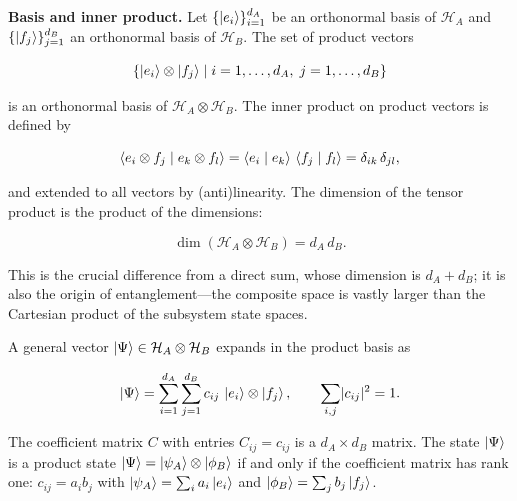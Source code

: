 \medskip\noindent\textbf{Basis and inner product.}
Let $\{\ket{e_i}\}_{i=1}^{d_A}$ be an orthonormal basis of $\mathcal{H}_A$ and $\{\ket{f_j}\}_{j=1}^{d_B}$ an orthonormal basis of $\mathcal{H}_B$. The set of product vectors
\begin{linenomath}
\begin{equation}
\{\ket{e_i} \otimes \ket{f_j} \mid i = 1,\ldots,d_A,\; j = 1,\ldots,d_B\}
\label{eq:tensor-product-basis}
\end{equation}
\end{linenomath}
is an orthonormal basis of $\mathcal{H}_A \otimes \mathcal{H}_B$. The inner product on product vectors is defined by
\begin{linenomath}
\begin{equation}
\braket{e_i \otimes f_j \mid e_k \otimes f_l}
= \braket{e_i \mid e_k}\,\braket{f_j \mid f_l}
= \delta_{ik}\,\delta_{jl},
\label{eq:tensor-inner-product}
\end{equation}
\end{linenomath}
and extended to all vectors by (anti)linearity. The dimension of the tensor product is the product of the dimensions:
\begin{linenomath}
\begin{equation}
\dim(\mathcal{H}_A \otimes \mathcal{H}_B) = d_A\,d_B.
\end{equation}
\end{linenomath}
This is the crucial difference from a direct sum, whose dimension is $d_A + d_B$; it is also the origin of entanglement---the composite space is vastly larger than the Cartesian product of the subsystem state spaces.

A general vector $\ket{\Psi} \in \mathcal{H}_A \otimes \mathcal{H}_B$ expands in the product basis as
\begin{linenomath}
\begin{equation}
\ket{\Psi} = \sum_{i=1}^{d_A}\sum_{j=1}^{d_B} c_{ij}\,\ket{e_i} \otimes \ket{f_j},
\qquad
\sum_{i,j} \lvert c_{ij}\rvert^2 = 1.
\end{equation}
\end{linenomath}
The coefficient matrix $C$ with entries $C_{ij} = c_{ij}$ is a $d_A \times d_B$ matrix. The state $\ket{\Psi}$ is a product state $\ket{\Psi} = \ket{\psi_A} \otimes \ket{\phi_B}$ if and only if the coefficient matrix has rank one: $c_{ij} = a_i b_j$ with $\ket{\psi_A} = \sum_i a_i \ket{e_i}$ and $\ket{\phi_B} = \sum_j b_j \ket{f_j}$.

